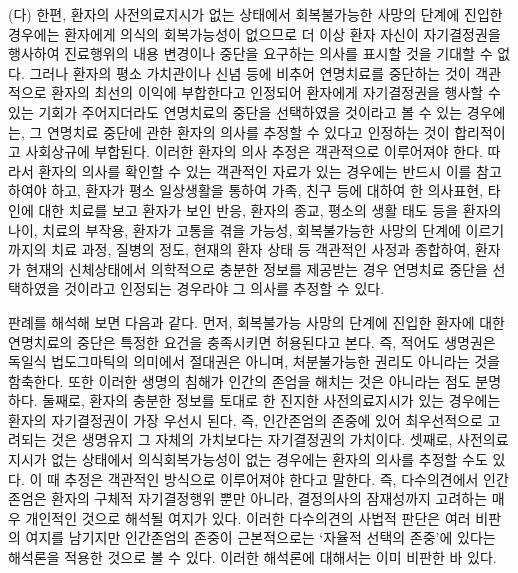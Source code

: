 (다) 한편, 환자의 사전의료지시가 없는 상태에서 회복불가능한 사망의 단계에 진입한 경우에는 환자에게 의식의 회복가능성이 없으므로 더 이상 환자 자신이 자기결정권을 행사하여 진료행위의 내용 변경이나 중단을 요구하는 의사를 표시할 것을 기대할 수 없다. 그러나 환자의 평소 가치관이나 신념 등에 비추어 연명치료를 중단하는 것이 객관적으로 환자의 최선의 이익에 부합한다고 인정되어 환자에게 자기결정권을 행사할 수 있는 기회가 주어지더라도 연명치료의 중단을 선택하였을 것이라고 볼 수 있는 경우에는, 그 연명치료 중단에 관한 환자의 의사를 추정할 수 있다고 인정하는 것이 합리적이고 사회상규에 부합된다. 이러한 환자의 의사 추정은 객관적으로 이루어져야 한다. 따라서 환자의 의사를 확인할 수 있는 객관적인 자료가 있는 경우에는 반드시 이를 참고하여야 하고, 환자가 평소 일상생활을 통하여 가족, 친구 등에 대하여 한 의사표현, 타인에 대한 치료를 보고 환자가 보인 반응, 환자의 종교, 평소의 생활 태도 등을 환자의 나이, 치료의 부작용, 환자가 고통을 겪을 가능성, 회복불가능한 사망의 단계에 이르기까지의 치료 과정, 질병의 정도, 현재의 환자 상태 등 객관적인 사정과 종합하여, 환자가 현재의 신체상태에서 의학적으로 충분한 정보를 제공받는 경우 연명치료 중단을 선택하였을 것이라고 인정되는 경우라야 그 의사를 추정할 수 있다.

판례를 해석해 보면 다음과 같다. 먼저, 회복불가능 사망의 단계에 진입한 환자에 대한 연명치료의 중단은 특정한 요건을 충족시키면 허용된다고 본다. 즉, 적어도 생명권은 독일식 법도그마틱의 의미에서 절대권은 아니며, 처분불가능한 권리도 아니라는 것을 함축한다. 또한 이러한 생명의 침해가 인간의 존엄을 해치는 것은 아니라는 점도 분명하다. 둘째로, 환자의 충분한 정보를 토대로 한 진지한 사전의료지시가 있는 경우에는 환자의 자기결정권이 가장 우선시 된다. 즉, 인간존엄의 존중에 있어 최우선적으로 고려되는 것은 생명유지 그 자체의 가치보다는 자기결정권의 가치이다. 셋째로, 사전의료지시가 없는 상태에서 의식회복가능성이 없는 경우에는 환자의 의사를 추정할 수도 있다. 이 때 추정은 객관적인 방식으로 이루어져야 한다고 말한다. 즉, 다수의견에서 인간존엄은 환자의 구체적 자기결정행위 뿐만 아니라, 결정의사의 잠재성까지 고려하는 매우 개인적인 것으로 해석될 여지가 있다. 이러한 다수의견의 사법적 판단은 여러 비판의 여지를 남기지만 인간존엄의 존중이 근본적으로는 `자율적 선택의 존중'에 있다는 해석론을 적용한 것으로 볼 수 있다. 이러한 해석론에 대해서는 이미 비판한 바 있다.

